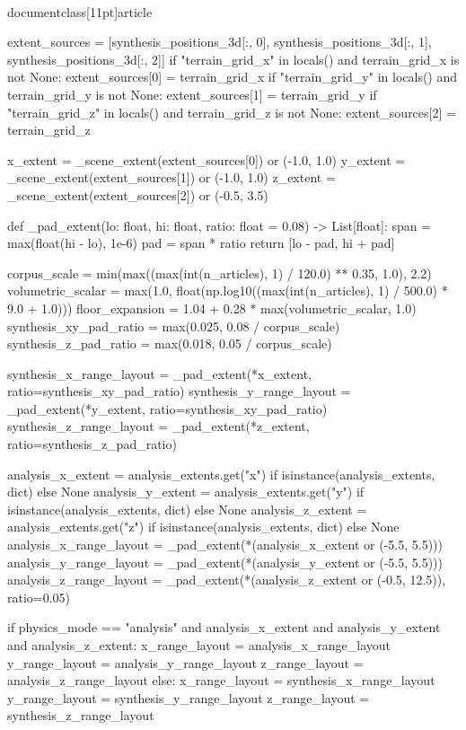 \\documentclass[11pt]{article}
\begin{document}
\begin{CodeBlock}
{{{{{{    extent_sources = [synthesis_positions_3d[:, 0], synthesis_positions_3d[:, 1], synthesis_positions_3d[:, 2]]
    if "terrain_grid_x" in locals() and terrain_grid_x is not None:
        extent_sources[0] = terrain_grid_x
    if "terrain_grid_y" in locals() and terrain_grid_y is not None:
        extent_sources[1] = terrain_grid_y
    if "terrain_grid_z" in locals() and terrain_grid_z is not None:
        extent_sources[2] = terrain_grid_z

    x_extent = _scene_extent(extent_sources[0]) or (-1.0, 1.0)
    y_extent = _scene_extent(extent_sources[1]) or (-1.0, 1.0)
    z_extent = _scene_extent(extent_sources[2]) or (-0.5, 3.5)

    def _pad_extent(lo: float, hi: float, ratio: float = 0.08) -> List[float]:
        span = max(float(hi - lo), 1e-6)
        pad = span * ratio
        return [lo - pad, hi + pad]

    corpus_scale = min(max((max(int(n_articles), 1) / 120.0) ** 0.35, 1.0), 2.2)
    volumetric_scalar = max(1.0, float(np.log10((max(int(n_articles), 1) / 500.0) * 9.0 + 1.0)))
    floor_expansion = 1.04 + 0.28 * max(volumetric_scalar, 1.0)
    synthesis_xy_pad_ratio = max(0.025, 0.08 / corpus_scale)
    synthesis_z_pad_ratio = max(0.018, 0.05 / corpus_scale)

    synthesis_x_range_layout = _pad_extent(*x_extent, ratio=synthesis_xy_pad_ratio)
    synthesis_y_range_layout = _pad_extent(*y_extent, ratio=synthesis_xy_pad_ratio)
    synthesis_z_range_layout = _pad_extent(*z_extent, ratio=synthesis_z_pad_ratio)

    analysis_x_extent = analysis_extents.get("x") if isinstance(analysis_extents, dict) else None
    analysis_y_extent = analysis_extents.get("y") if isinstance(analysis_extents, dict) else None
    analysis_z_extent = analysis_extents.get("z") if isinstance(analysis_extents, dict) else None
    analysis_x_range_layout = _pad_extent(*(analysis_x_extent or (-5.5, 5.5)))
    analysis_y_range_layout = _pad_extent(*(analysis_y_extent or (-5.5, 5.5)))
    analysis_z_range_layout = _pad_extent(*(analysis_z_extent or (-0.5, 12.5)), ratio=0.05)

    if physics_mode == "analysis" and analysis_x_extent and analysis_y_extent and analysis_z_extent:
        x_range_layout = analysis_x_range_layout
        y_range_layout = analysis_y_range_layout
        z_range_layout = analysis_z_range_layout
    else:
        x_range_layout = synthesis_x_range_layout
        y_range_layout = synthesis_y_range_layout
        z_range_layout = synthesis_z_range_layout

}}}}}}
\end{CodeBlock}
\end{document}
